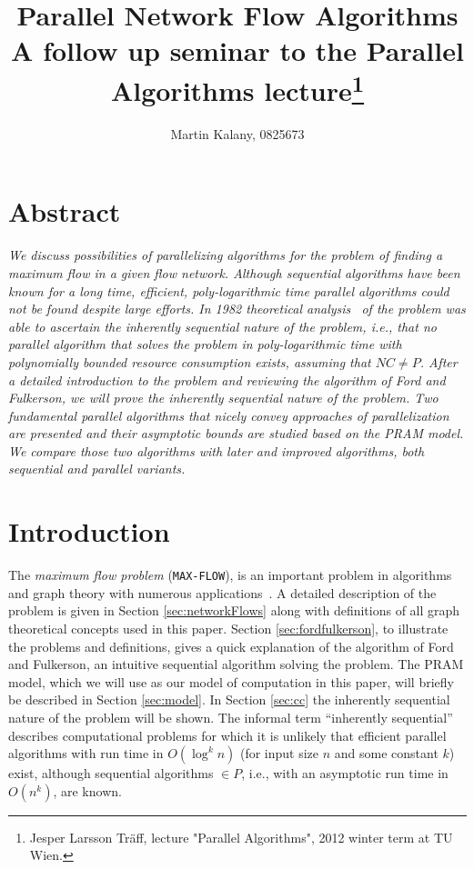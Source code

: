 \documentclass[a4paper,10pt, twocolumn]{article}
\title{Parallel Network Flow Algorithms \\ 
\large A follow up seminar to the Parallel Algorithms lecture\footnote{Jesper Larsson Träff, lecture "Parallel Algorithms", 2012 winter term at TU Wien.}}
\author{Martin Kalany, 0825673}
\begin{document}
\maketitle

\section{Abstract}
\label{sec:abstract}
\textit{We discuss possibilities of parallelizing algorithms for the problem of finding a maximum flow in a given flow network. Although sequential algorithms have been known for a long time, efficient, poly-logarithmic time parallel algorithms could not be found despite large efforts. In 1982 theoretical analysis~\cite{Goldschlager82} of the problem was able to ascertain the inherently sequential nature of the problem, i.e., that no parallel algorithm that solves the problem in poly-logarithmic time with polynomially bounded resource consumption exists, assuming that $NC \neq P$. After a detailed introduction to the problem and reviewing the algorithm of Ford and Fulkerson, we will prove the inherently sequential nature of the problem. Two fundamental parallel algorithms that nicely convey approaches of parallelization are presented and their asymptotic bounds are studied based on the PRAM model. We compare those two algorithms with later and improved algorithms, both sequential and parallel variants.}


\section{Introduction}
\label{sec:intro}
The \emph{maximum flow problem} (\lstinline|MAX-FLOW|), is an important problem in algorithms and graph theory with numerous applications~\cite{ahuja93}. A detailed description of the problem is given in Section \ref{sec:networkFlows} along with definitions of all graph theoretical concepts used in this paper. Section \ref{sec:fordfulkerson}, to illustrate the problems and definitions, gives a quick explanation of the algorithm of Ford and Fulkerson, an intuitive sequential algorithm solving the problem. The PRAM model, which we will use as our model of computation in this paper, will briefly be described in Section \ref{sec:model}. In Section \ref{sec:cc} the inherently sequential nature of the problem will be shown. The informal term ``inherently sequential'' describes computational problems for which it is unlikely that efficient parallel algorithms with run time in $O(\log^{k}n)$ (for input size $n$ and some constant $k$) exist, although sequential algorithms $\in P$, i.e., with an asymptotic run time in $O(n^{k})$, are known.
\end{document}
